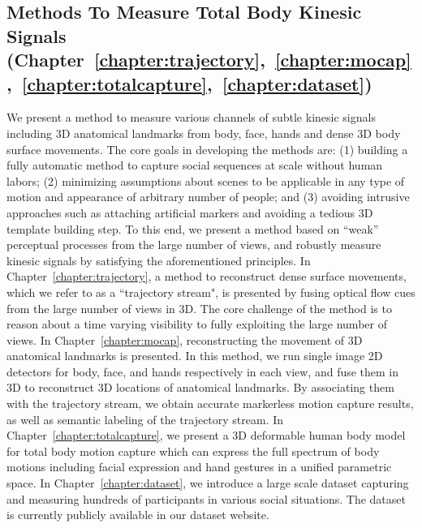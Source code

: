 \subsection{Methods To Measure Total Body Kinesic Signals (Chapter~\ref{chapter:trajectory},~\ref{chapter:mocap},~\ref{chapter:totalcapture},~\ref{chapter:dataset})}

We present a method to measure various channels of subtle kinesic signals including 3D anatomical landmarks from body, face, hands and dense 3D body surface movements. The core goals in developing the methods are: (1) building a fully automatic method to capture social sequences at scale without human labors; (2) minimizing assumptions about scenes to be applicable in any type of motion and appearance of arbitrary number of people; and (3) avoiding intrusive approaches such as attaching artificial markers and avoiding a tedious 3D template building step. To this end, we present a method based on ``weak'' perceptual processes from the large number of views, and robustly measure kinesic signals by satisfying the aforementioned principles. In Chapter~\ref{chapter:trajectory}, a method to reconstruct dense surface movements, which we refer to as a ``trajectory stream", is presented by fusing optical flow cues from the large number of views in 3D. The core challenge of the method is to reason about a time varying visibility to fully exploiting the large number of views. In Chapter~\ref{chapter:mocap}, reconstructing the movement of 3D anatomical landmarks is presented. In this method, we run single image 2D detectors for body, face, and hands respectively in each view, and fuse them in 3D to reconstruct 3D locations of anatomical landmarks. By associating them with the trajectory stream, we obtain accurate markerless motion capture results, as well as semantic labeling of the trajectory stream.  In Chapter~\ref{chapter:totalcapture}, we present a 3D deformable human body model for total body motion capture which can express the full spectrum of body motions including facial expression and hand gestures in a unified parametric space. In Chapter~\ref{chapter:dataset}, we introduce a large scale dataset capturing and measuring hundreds of participants in various social situations. The dataset is currently publicly available in our dataset website. 


